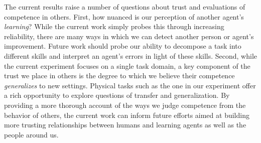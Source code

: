 \documentclass[10pt,letterpaper]{article}
\begin{document}
The current results raise a number of questions about trust and evaluations of competence in others. First, how nuanced is our perception of another agent's \textit{learning}? While the current work simply probes this through increasing reliability, there are many ways in which we can detect another person or agent's improvement. Future work should probe our ability to decompose a task into different skills and interpret an agent's errors in light of these skills. Second, while the current experiment focuses on a single task domain, a key component of the trust we place in others is the degree to which we believe their competence \textit{generalizes} to new settings. Physical tasks such as the one in our experiment offer a rich opportunity to explore questions of transfer and generalization. By providing a more thorough account of the ways we judge competence from the behavior of others, the current work can inform future efforts aimed at building more trusting relationships between humans and learning agents as well as the people around us.










\setlength{\bibleftmargin}{.125in}
\setlength{\bibindent}{-\bibleftmargin}
\typeout{} %

\end{document}

